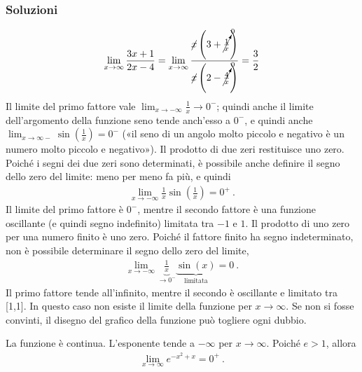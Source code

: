 \documentclass[letterpaper,10pt,italian]{jupyterBook}
\begin{document}
\subsubsection*{Soluzioni}

\sphinxAtStartPar
{}
\begin{equation*}
\begin{split}\lim_{x \to \infty} \frac{3x + 1}{2x - 4} = \lim_{x \to \infty} \frac{\cancel{x} \left( 3 + \cancelto{0}{\frac{1}{x}} \right)}{\cancel{x} \left(2 - \cancelto{0}{\frac{4}{x}}\right)} = \frac{3}{2}\end{split}
\end{equation*}
\sphinxAtStartPar
{} Il limite del primo fattore vale \(\lim_{x\to-\infty}\frac{1}{x} \to 0^-\); quindi anche il limite dell’argomento della funzione seno tende anch’esso a \(0^-\), e quindi anche \(\lim_{x\to\infty-} \sin\left(\frac{1}{x}\right) = 0^-\) («il seno di un angolo molto piccolo e negativo è un numero molto piccolo e negativo»). Il prodotto di due zeri restituisce uno zero. Poiché i segni dei due zeri sono determinati, è possibile anche definire il segno dello zero del limite: meno per meno fa più, e quindi
\begin{equation*}
\begin{split}\lim_{x \to -\infty} \frac{1}{x} \sin\left(\frac{1}{x}\right) = 0^+ \ .\end{split}
\end{equation*}
\sphinxAtStartPar
{} Il limite del primo fattore è \(0^-\), mentre il secondo fattore è una funzione oscillante (e quindi segno indefinito) limitata tra \(-1\) e \(1\). Il prodotto di uno zero per una numero finito è uno zero. Poiché il fattore finito ha segno indeterminato, non è possibile determinare il segno dello zero del limite,
\begin{equation*}
\begin{split}\lim_{x \to -\infty} \underbrace{\frac{1}{x}}_{\to 0^-} \underbrace{\sin\left( x \right)}_{\text{limitata}} = 0 \ .\end{split}
\end{equation*}
\sphinxAtStartPar
{} Il primo fattore tende all’infinito, mentre il secondo è oscillante e limitato tra {[}\sphinxhyphen{}1,1{]}. In questo caso non esiste il limite della funzione per \(x \rightarrow \infty\). Se non si fosse convinti, il disegno del grafico della funzione può togliere ogni dubbio.

\sphinxAtStartPar
{} La funzione è continua. L’esponente tende a \(-\infty\) per \(x \rightarrow \infty\). Poiché \(e > 1\), allora
\begin{equation*}
\begin{split}\lim_{x \to \infty} e^{-x^2+x} = 0^+ \ .\end{split}
\end{equation*}
\sphinxAtStartPar
{}
\end{document}
